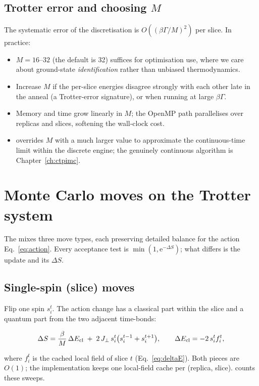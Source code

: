 \subsection{Trotter error and choosing $M$}

The systematic error of the discretisation is $O\!\left((\beta\Gamma/M)^2\right)$
per slice. In practice:
\begin{itemize}
\item $M=16$--$32$ (the default is 32) suffices for optimisation use, where
we care about ground-state \emph{identification} rather than unbiased
thermodynamics.
\item Increase $M$ if the per-slice energies disagree strongly with each
other late in the anneal (a Trotter-error signature), or when running at
large $\beta\Gamma$.
\item Memory and time grow linearly in $M$; the OpenMP path parallelises
over replicas and slices, softening the wall-clock cost.
\item {} overrides $M$ with a much larger
value to approximate the continuous-time limit within the discrete engine;
the genuinely continuous algorithm is Chapter~\ref{ch:ctpimc}.
\end{itemize}

\section{Monte Carlo moves on the Trotter system}
\label{sec:sqa-moves}

The  mixes three move types, each preserving detailed
balance for the action Eq.~\eqref{eq:action}. Every acceptance test is
$\min(1,\mathrm{e}^{-\Delta S})$; what differs is the update and its
$\Delta S$.

\subsection{Single-spin (slice) moves}

Flip one spin $s^t_i$. The action change has a classical part within the
slice and a quantum part from the two adjacent time-bonds:
\begin{keyeq}
\begin{equation}
\Delta S=\frac{\beta}{M}\,\Delta E_{\mathrm{cl}}
\;+\;2\,J_{\perp}\,s^t_i\bigl(s^{t-1}_i+s^{t+1}_i\bigr),
\qquad \Delta E_{\mathrm{cl}}=-2\,s^t_i f^t_i ,
\label{eq:sqa-flip}
\end{equation}
\end{keyeq}
where $f^t_i$ is the cached local field of slice $t$
(Eq.~\eqref{eq:deltaE}). Both pieces are $O(1)$; the implementation keeps
one local-field cache per (replica, slice).  counts
these sweeps.

